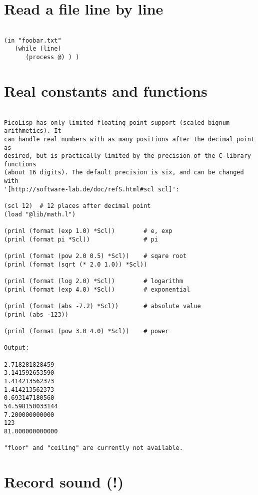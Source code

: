 \section*{Read a file line by line}

\begin{verbatim}

(in "foobar.txt"
   (while (line)
      (process @) ) )

\end{verbatim}

\section*{Real constants and functions}

\begin{verbatim}

PicoLisp has only limited floating point support (scaled bignum arithmetics). It
can handle real numbers with as many positions after the decimal point as
desired, but is practically limited by the precision of the C-library functions
(about 16 digits). The default precision is six, and can be changed with
'[http://software-lab.de/doc/refS.html#scl scl]':

(scl 12)  # 12 places after decimal point
(load "@lib/math.l")

(prinl (format (exp 1.0) *Scl))        # e, exp
(prinl (format pi *Scl))               # pi

(prinl (format (pow 2.0 0.5) *Scl))    # sqare root
(prinl (format (sqrt (* 2.0 1.0)) *Scl))

(prinl (format (log 2.0) *Scl))        # logarithm
(prinl (format (exp 4.0) *Scl))        # exponential

(prinl (format (abs -7.2) *Scl))       # absolute value
(prinl (abs -123))

(prinl (format (pow 3.0 4.0) *Scl))    # power

Output:

2.718281828459
3.141592653590
1.414213562373
1.414213562373
0.693147180560
54.598150033144
7.200000000000
123
81.000000000000

"floor" and "ceiling" are currently not available.

\end{verbatim}

\section*{Record sound (!)}

